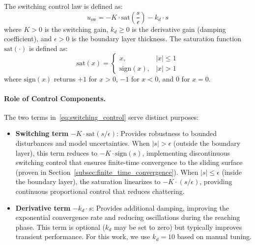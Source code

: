 The switching control law is defined as:
\begin{equation}
\label{eq:switching_control}
u_{\text{sw}} = -K \cdot \text{sat}\left(\frac{s}{\epsilon}\right) - k_d \cdot s
\end{equation}
where $K > 0$ is the switching gain, $k_d \geq 0$ is the derivative gain (damping coefficient), and $\epsilon > 0$ is the boundary layer thickness. The saturation function $\text{sat}(\cdot)$ is defined as:
\begin{equation}
\label{eq:saturation_function}
\text{sat}(x) =
\begin{cases}
x, & |x| \leq 1 \\
\text{sign}(x), & |x| > 1
\end{cases}
\end{equation}
where $\text{sign}(x)$ returns $+1$ for $x > 0$, $-1$ for $x < 0$, and $0$ for $x = 0$.

\paragraph{Role of Control Components.}
The two terms in~\eqref{eq:switching_control} serve distinct purposes:
\begin{itemize}
    \item \textbf{Switching term} $-K \cdot \text{sat}(s/\epsilon)$: Provides robustness to bounded disturbances and model uncertainties. When $|s| > \epsilon$ (outside the boundary layer), this term reduces to $-K \cdot \text{sign}(s)$, implementing discontinuous switching control that ensures finite-time convergence to the sliding surface (proven in Section~\ref{subsec:finite_time_convergence}). When $|s| \leq \epsilon$ (inside the boundary layer), the saturation linearizes to $-K \cdot (s/\epsilon)$, providing continuous proportional control that reduces chattering.

    \item \textbf{Derivative term} $-k_d \cdot s$: Provides additional damping, improving the exponential convergence rate and reducing oscillations during the reaching phase. This term is optional ($k_d$ may be set to zero) but typically improves transient performance. For this work, we use $k_d = 10$ based on manual tuning.
\end{itemize}


